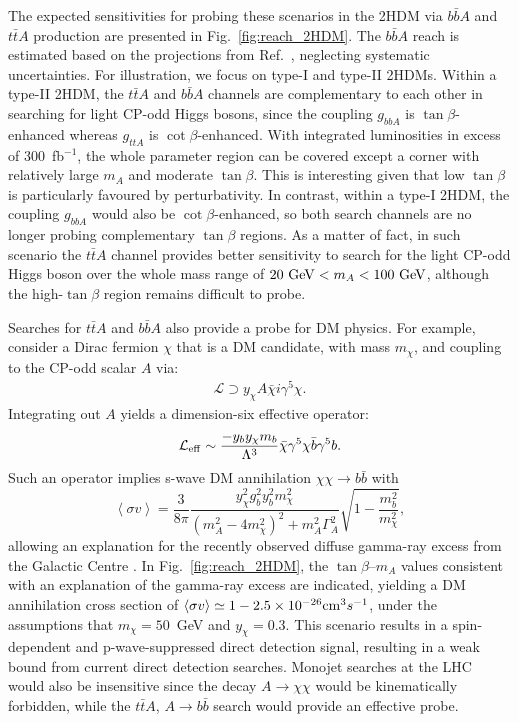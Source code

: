 \documentclass[preprintnumbers,superscriptaddress,nofootinbib,aps,prd,floatfix]{revtex4}
\begin{document}
The expected sensitivities for probing these scenarios in the 2HDM via $b\bar bA$ and $t\bar{t}A$ production are presented in Fig.~\ref{fig:reach_2HDM}. 
The $b\bar{b}A$ reach is estimated based on the projections from Ref.~\cite{Kozaczuk:2015bea}, neglecting systematic uncertainties. 
For illustration, we focus on type-I and type-II 2HDMs. 
Within a type-II  2HDM, the $t\bar{t}A$ and $b\bar{b}A$ channels are complementary to each other in searching for light CP-odd Higgs bosons, since the coupling $g_{bbA}$ is $\tan\beta$-enhanced whereas $g_{ttA}$ is $\cot \beta$-enhanced. With integrated luminosities in excess of 300~fb$^{-1}$, the whole parameter region can be covered except a corner with relatively large $m_A$ and moderate $\tan\beta$. This is interesting given that low $\tan\beta$ is particularly favoured by perturbativity. In contrast, within a type-I 2HDM, the coupling $g_{bbA}$ would also be $\cot\beta$-enhanced, so both search channels are no longer probing complementary $\tan\beta$ regions. As a matter of fact, in such scenario the $t\bar{t}A$ channel provides better sensitivity to search for the light CP-odd Higgs boson over the whole mass range of $20~{\rm GeV} < m_A < 100~{\rm GeV}$, although the high-$\tan\beta$ region remains difficult to probe. 

Searches for $t\bar {t}A$ and $b\bar {b} A$ also provide a probe for DM physics. For example, consider a Dirac fermion $\chi$ that is a DM candidate, with mass $m_\chi$, and coupling to the CP-odd scalar $A$ via:
\begin{eqnarray}
\mathcal {L} \supset y_\chi A \bar \chi i  \gamma^5 \chi.
\end{eqnarray}
Integrating out $A$ yields a dimension-six effective operator:
\begin{eqnarray}
\mathcal {L}_{\rm eff} \sim  \frac{- y_b y_\chi m_b   }{\Lambda^3} \bar \chi   \gamma^5 \chi \bar b   \gamma^5 b.
\end{eqnarray}
Such an operator implies s-wave DM annihilation $\chi \chi \to b\bar{b}$ with
\begin{equation}
\left < \sigma v \right > = \frac{3}{8 \pi} \frac{y^2_\chi g_b^2 y_b^2 m_{\chi}^2}{(m_A^2 - 4 m_{\chi}^2)^2 + m_A^2 \Gamma_A^2} \sqrt{1-\frac{m_b^2}{m_\chi^2}},
\label{eq:anhil}
\end{equation}
allowing an explanation for the recently observed diffuse gamma-ray excess from the Galactic Centre \cite{Goodenough:2009gk,Vitale:2009hr}.
In Fig.~\ref{fig:reach_2HDM}, the $\tan\beta$--$m_A$ values consistent with an explanation of the gamma-ray excess are indicated, yielding a DM annihilation cross section of $\langle \sigma v \rangle  \simeq 1-2.5 \times 10^{-26} {\rm cm}^3 {\rm} s^{-1}$, under the assumptions that 
$m_{\chi}=50$~GeV \cite{Calore:2014nla} and  $y_\chi= 0.3$.  
This scenario results in a spin-dependent and p-wave-suppressed direct detection signal, resulting in a weak bound from current direct detection searches.
Monojet searches at the LHC would also be insensitive since the decay $A \to \chi \chi$ would be kinematically forbidden, while the $t\bar {t}A$, $A \to b\bar{b}$ search would provide an effective probe.
\end{document}
